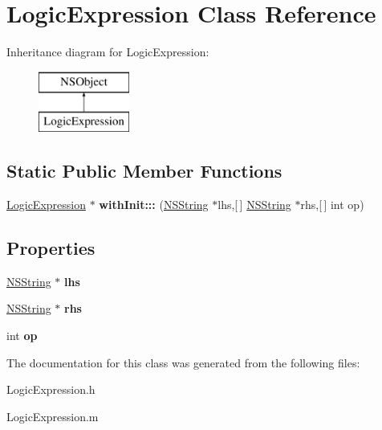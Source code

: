 \hypertarget{interface_logic_expression}{
\section{\-Logic\-Expression \-Class \-Reference}
\label{interface_logic_expression}
}
\-Inheritance diagram for \-Logic\-Expression\-:\begin{figure}[H]
\begin{center}
\leavevmode
\includegraphics[height=2.000000cm]{interface_logic_expression}
\end{center}
\end{figure}
\subsection*{\-Static \-Public \-Member \-Functions}
\begin{DoxyCompactItemize}
\item 
\hypertarget{interface_logic_expression_a6f3209be5aea5aced08820a308643e9d}{
\hyperlink{interface_logic_expression}{\-Logic\-Expression} $\ast$ {\bfseries with\-Init\-:::} (\hyperlink{class_n_s_string}{\-N\-S\-String} $\ast$lhs,\mbox{[}$\,$\mbox{]} \hyperlink{class_n_s_string}{\-N\-S\-String} $\ast$rhs,\mbox{[}$\,$\mbox{]} int op)}
\label{interface_logic_expression_a6f3209be5aea5aced08820a308643e9d}

\end{DoxyCompactItemize}
\subsection*{\-Properties}
\begin{DoxyCompactItemize}
\item 
\hypertarget{interface_logic_expression_ac71111153d59f489e49e08671269d75c}{
\hyperlink{class_n_s_string}{\-N\-S\-String} $\ast$ {\bfseries lhs}}
\label{interface_logic_expression_ac71111153d59f489e49e08671269d75c}

\item 
\hypertarget{interface_logic_expression_a5cc866390f4e5dbe2a2333b59f029f50}{
\hyperlink{class_n_s_string}{\-N\-S\-String} $\ast$ {\bfseries rhs}}
\label{interface_logic_expression_a5cc866390f4e5dbe2a2333b59f029f50}

\item 
\hypertarget{interface_logic_expression_a5246e5c685edbc060526dbb81a469916}{
int {\bfseries op}}
\label{interface_logic_expression_a5246e5c685edbc060526dbb81a469916}

\end{DoxyCompactItemize}


\-The documentation for this class was generated from the following files\-:\begin{DoxyCompactItemize}
\item 
\-Logic\-Expression.\-h\item 
\-Logic\-Expression.\-m\end{DoxyCompactItemize}
